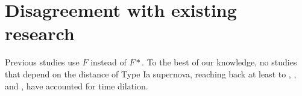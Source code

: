\documentclass{article}
\begin{document}
\section{Disagreement with existing research}

Previous studies use $F$ instead of $F*$. To the best of our knowledge, no
studies that depend on the distance of Type Ia supernova, reaching back at
least to \citet{kim1996}, \citet{riess1998}, and \citet{perlmutter1999}, have
accounted for time dilation.



\end{document}
